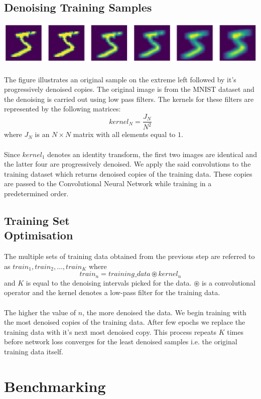 \documentclass[12pt]{article}
\begin{document}
\begin{multicols}{2}
		\subsection{Denoising Training Samples}
		\includegraphics[width=\linewidth]{assets/denoise.png}
		\\\\
		The figure illustrates an original sample on the extreme left followed by it's progressively denoised copies. The original image is from the MNIST dataset and the denoising is carried out using low pass filters. The kernels for these filters are represented by the following matrices:
		$$ kernel_{N} = \frac{J_{N}}{N^2} $$
		where $J_{N}$ is an $N \times N$ matrix with all elements equal to $1$.
		\\\\
		Since $kernel_{1}$ denotes an identity transform, the first two images are identical and the latter four are progressively denoised. We apply the said convolutions to the training dataset which returns denoised copies of the training data. These copies are passed to the Convolutional Neural Network while training in a predetermined order.
		\subsection{Training Set \\Optimisation}
		The multiple sets of training data obtained from the previous step are referred to as $train_{1},train_{2}, \hdots ,train_{K}$ where 
		$$train_{n} = training\_data \circledast kernel_{n} $$
		and $K$ is equal to the denoising intervals picked for the data. $\circledast$ is a convolutional operator and the kernel denotes a low-pass filter for the training data. 
		\\\\
		The higher the value of $n$, the more denoised the data. We begin training with the most denoised copies of the training data. After few epochs we replace the training data with it's next most denoised copy. This process repeats $K$ times before network loss converges for the least denoised samples i.e. the original training data itself.
		
		\section{Benchmarking}
		

\end{multicols}
\end{document}

